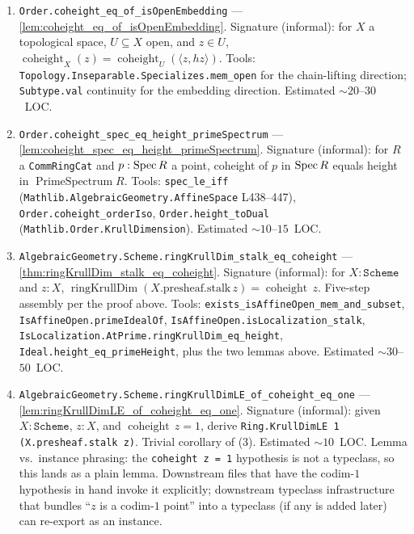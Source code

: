 \begin{enumerate}
  \item \texttt{Order.coheight\_eq\_of\_isOpenEmbedding} ---
    \cref{lem:coheight_eq_of_isOpenEmbedding}. Signature (informal): for
    \(X\) a topological space, \(U \subseteq X\) open, and \(z \in U\),
    \(\operatorname{coheight}_{X}(z) = \operatorname{coheight}_{U}(\langle z, hz\rangle)\).
    Tools: \texttt{Topology.Inseparable.Specializes.mem\_open} for the
    chain-lifting direction; \texttt{Subtype.val} continuity for the
    embedding direction. Estimated \(\sim 20\)--\(30\)~LOC.
  \item \texttt{Order.coheight\_spec\_eq\_height\_primeSpectrum} ---
    \cref{lem:coheight_spec_eq_height_primeSpectrum}. Signature (informal):
    for \(R\) a \texttt{CommRingCat} and \(p : \operatorname{Spec} R\) a point, coheight of \(p\)
    in \(\operatorname{Spec} R\) equals height in \(\operatorname{PrimeSpectrum} R\). Tools:
    \texttt{spec\_le\_iff} (\texttt{Mathlib.AlgebraicGeometry.AffineSpace} L438--447),
    \texttt{Order.coheight\_orderIso}, \texttt{Order.height\_toDual}
    (\texttt{Mathlib.Order.KrullDimension}). Estimated \(\sim 10\)--\(15\)~LOC.
  \item \texttt{AlgebraicGeometry.Scheme.ringKrullDim\_stalk\_eq\_coheight} ---
    \cref{thm:ringKrullDim_stalk_eq_coheight}. Signature (informal): for
    \(X : \texttt{Scheme}\) and \(z : X\),
    \(\operatorname{ringKrullDim}(X.\text{presheaf.stalk}\,z) =
    \operatorname{coheight}\,z\). Five-step assembly per the proof above.
    Tools: \texttt{exists\_isAffineOpen\_mem\_and\_subset},
    \texttt{IsAffineOpen.primeIdealOf}, \texttt{IsAffineOpen.isLocalization\_stalk},
    \texttt{IsLocalization.AtPrime.ringKrullDim\_eq\_height},
    \texttt{Ideal.height\_eq\_primeHeight}, plus the two lemmas above.
    Estimated \(\sim 30\)--\(50\)~LOC.
  \item \texttt{AlgebraicGeometry.Scheme.ringKrullDimLE\_of\_coheight\_eq\_one} ---
    \cref{lem:ringKrullDimLE_of_coheight_eq_one}. Signature (informal):
    given \(X : \texttt{Scheme}\), \(z : X\), and \(\operatorname{coheight}\,z = 1\),
    derive \texttt{Ring.KrullDimLE 1 (X.presheaf.stalk z)}. Trivial corollary
    of (3). Estimated \(\sim 10\)~LOC. Lemma vs.\ instance phrasing: the
    \texttt{coheight\,z = 1} hypothesis is not a typeclass, so this lands as
    a plain lemma. Downstream files that have the codim-\(1\) hypothesis in
    hand invoke it explicitly; downstream typeclass infrastructure that
    bundles ``\(z\) is a codim-\(1\) point'' into a typeclass (if any is added
    later) can re-export as an instance.
\end{enumerate}

